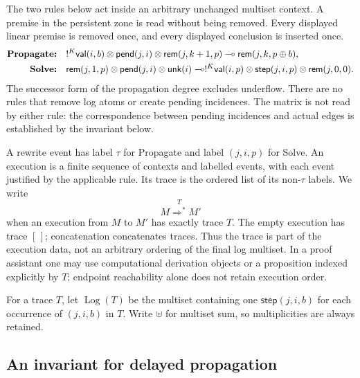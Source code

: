 The two rules below act inside an arbitrary unchanged multiset context.
A premise in the persistent zone is read without being removed. Every displayed
linear premise is removed once, and every displayed conclusion is inserted once.
\begin{align*}
\textbf{Propagate:}\quad
 &!^K\mathsf{val}(i,b)\otimes\mathsf{pend}(j,i)
       \otimes\mathsf{rem}(j,k+1,p)
   \multimap\mathsf{rem}(j,k,p\oplus b),\\
\textbf{Solve:}\quad
 &\mathsf{rem}(j,1,p)\otimes\mathsf{pend}(j,i)\otimes\mathsf{unk}(i)
   \multimap !^K\mathsf{val}(i,p)\otimes\mathsf{step}(j,i,p)
        \otimes\mathsf{rem}(j,0,0).
\end{align*}
The successor form of the propagation degree excludes underflow.
There are no rules that remove log atoms or create pending incidences.
The matrix is not read by either rule: the correspondence between pending
incidences and actual edges is established by the invariant below.

A rewrite event has label $\tau$ for Propagate and label $(j,i,p)$ for Solve.
An execution is a finite sequence of contexts and labelled events, with each
event justified by the applicable rule. Its trace is the ordered list of its
non-$\tau$ labels. We write
\[
 M\overset{T}{\Longrightarrow^{*}}M'
\]
when an execution from $M$ to $M'$ has exactly trace $T$.
The empty execution has trace $[\,]$; concatenation concatenates traces.
Thus the trace is part of the execution data, not an arbitrary ordering of the
final log multiset. In a proof assistant one may use computational derivation
objects or a proposition indexed explicitly by $T$; endpoint reachability alone
does not retain execution order.

For a trace $T$, let $\operatorname{Log}(T)$ be the multiset containing one
$\mathsf{step}(j,i,b)$ for each occurrence of $(j,i,b)$ in $T$.
Write $\uplus$ for multiset sum, so multiplicities are always retained.

\subsection{An invariant for delayed propagation}
\label{sec:sem-invariant}

